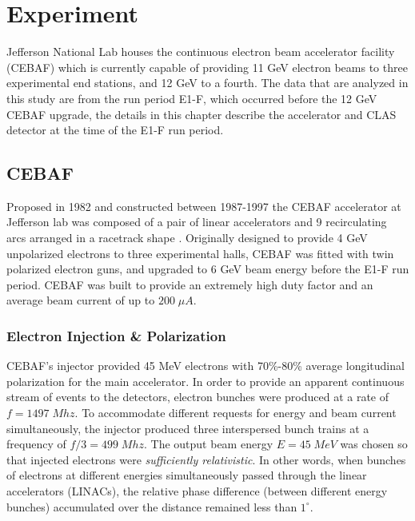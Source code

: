 \chapter{Experiment}
Jefferson National Lab houses the continuous electron beam accelerator facility (CEBAF) which is currently capable of providing 11 GeV electron beams to three experimental end stations, and 12 GeV to a fourth.  The data that are analyzed in this study are from the run period E1-F, which occurred before the 12 GeV CEBAF upgrade, the details in this chapter describe the accelerator and CLAS detector at the time of the E1-F run period.  \\

\section{CEBAF} 
Proposed in 1982 and constructed between 1987-1997 the CEBAF accelerator at Jefferson lab was composed of a pair of linear accelerators and 9 recirculating arcs arranged in a racetrack shape \cite{hardware-leeman:2001, hardware-chao:2011}.  Originally designed to provide 4 GeV unpolarized electrons to three experimental halls, CEBAF was fitted with twin polarized electron guns, and upgraded to 6 GeV beam energy before the E1-F run period.  CEBAF was built to provide an extremely high duty factor and an average beam current of up to $200 \; \mu A$.\\


\subsection{Electron Injection \& Polarization}
CEBAF's injector provided 45 MeV electrons with 70\%-80\% average longitudinal polarization for the main accelerator.  In order to provide an apparent continuous stream of events to the detectors, electron bunches were produced at a rate of $f = 1497 \; Mhz$.  To accommodate different requests for energy and beam current simultaneously, the injector produced three interspersed bunch trains at a frequency of $f/3 = 499 \; Mhz$.  The output beam energy $E = 45 \; MeV$ was chosen so that injected electrons were \textit{sufficiently relativistic}.  In other words, when bunches of electrons at different energies simultaneously passed through the linear accelerators (LINACs), the relative phase difference (between different energy bunches) accumulated over the distance remained less than $1^\circ$. \\

